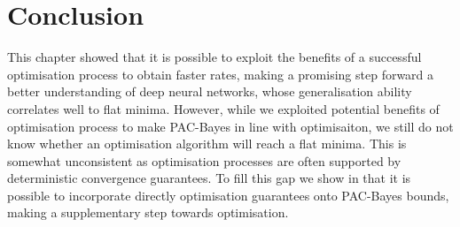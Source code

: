 \section{Conclusion}

This chapter showed that it is possible to exploit the benefits of a successful optimisation process to obtain faster rates, making a promising step forward a better understanding of deep neural networks, whose generalisation ability correlates well to flat minima. However, while we exploited potential benefits of optimisation process to make PAC-Bayes in line with optimisaiton, we still do not know whether an optimisation algorithm will reach a flat minima. This is somewhat unconsistent as optimisation processes are often supported by deterministic convergence guarantees. To fill this gap we show in  that it is possible to incorporate directly optimisation guarantees onto PAC-Bayes bounds, making a supplementary step towards optimisation.
